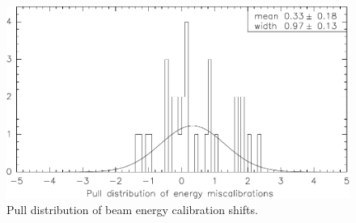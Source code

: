 \documentclass[aps,prd,preprint,superscriptaddress,tightenlines,nofootinbib,floatfix]{revtex4}
\begin{document}
\begin{figure}[p]
  \begin{center}
    \includegraphics[width=0.9\linewidth]{miscalpull}
  \end{center}
  \caption{\label{miscalpull} Pull distribution of beam energy
    calibration shifts.}
\end{figure}
\end{document}
